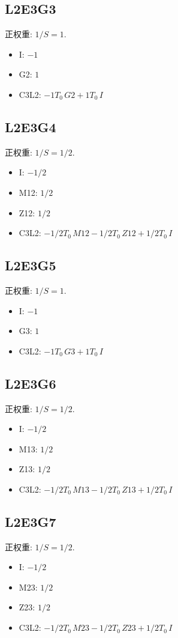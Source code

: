 \documentclass[UTF8]{ctexart}
\begin{document}
\subsection*{L2E3G3}

正权重: $1/S=1$.
\begin{itemize}
\item I: $- 1$
\item G2: $1$
\item C3L2: $- 1 T_0\,G2 + 1 T_0\,I$
\end{itemize}
\subsection*{L2E3G4}

正权重: $1/S=1/2$.
\begin{itemize}
\item I: $- 1/2$
\item M12: $1/2$
\item Z12: $1/2$
\item C3L2: $- 1/2 T_0\,M12 - 1/2 T_0\,Z12 + 1/2 T_0\,I$
\end{itemize}
\subsection*{L2E3G5}

正权重: $1/S=1$.
\begin{itemize}
\item I: $- 1$
\item G3: $1$
\item C3L2: $- 1 T_0\,G3 + 1 T_0\,I$
\end{itemize}
\subsection*{L2E3G6}

正权重: $1/S=1/2$.
\begin{itemize}
\item I: $- 1/2$
\item M13: $1/2$
\item Z13: $1/2$
\item C3L2: $- 1/2 T_0\,M13 - 1/2 T_0\,Z13 + 1/2 T_0\,I$
\end{itemize}
\subsection*{L2E3G7}

正权重: $1/S=1/2$.
\begin{itemize}
\item I: $- 1/2$
\item M23: $1/2$
\item Z23: $1/2$
\item C3L2: $- 1/2 T_0\,M23 - 1/2 T_0\,Z23 + 1/2 T_0\,I$
\end{itemize}
\end{document}
